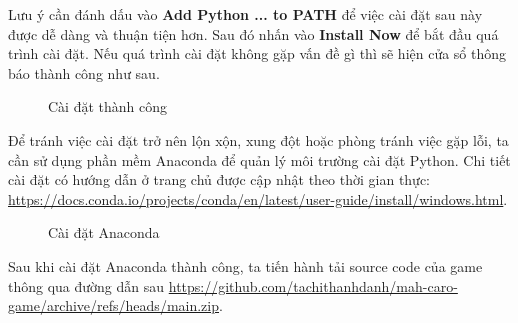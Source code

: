 Lưu ý cần đánh dấu vào \textbf{Add Python ... to PATH} để việc cài đặt sau này được dễ dàng và thuận tiện hơn. Sau đó nhấn vào \textbf{Install Now} để bắt đầu quá trình cài đặt. Nếu quá trình cài đặt không gặp vấn đề gì thì sẽ hiện cửa sổ thông báo thành công như sau.
\begin{figure}[H]
\caption{Cài đặt thành công}
\end{figure}
Để tránh việc cài đặt trở nên lộn xộn, xung đột hoặc phòng tránh việc gặp lỗi, ta cần sử dụng phần mềm Anaconda để quản lý môi trường cài đặt Python. Chi tiết cài đặt có hướng dẫn ở trang chủ được cập nhật theo thời gian thực: \url{https://docs.conda.io/projects/conda/en/latest/user-guide/install/windows.html}.
\begin{figure}[H]
\caption{Cài đặt Anaconda}
\end{figure}
Sau khi cài đặt Anaconda thành công, ta tiến hành tải source code của game thông qua đường dẫn sau \url{https://github.com/tachithanhdanh/mah-caro-game/archive/refs/heads/main.zip}.

